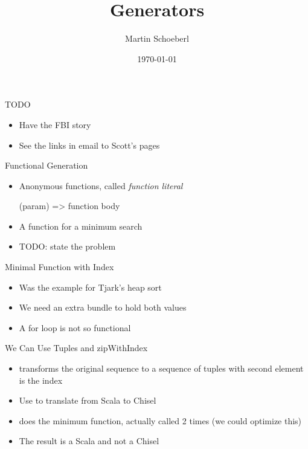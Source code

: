 

\newif\ifbook


\usepackage{tikz}
\usetikzlibrary{positioning, arrows.meta}


\title{Generators}
\author{Martin Schoeberl}
\date{\today}



\begin{frame}
\titlepage
\end{frame}

\begin{frame}[fragile]{TODO}
\begin{itemize}
\item Have the FBI story
\item See the links in email to Scott's pages
\end{itemize}
\end{frame}


\begin{frame}[fragile]{Functional Generation}
\begin{itemize}
\item Anonymous functions, called \emph{function literal}
\begin{chisel}
  (param) => function body
\end{chisel}
\item A function for a minimum search
\item TODO: state the problem
\end{itemize}
\end{frame}


\begin{frame}[fragile]{Minimal Function with Index}
\begin{itemize}
\item Was the example for Tjark's heap sort
\item We need an extra bundle to hold both values
\item A for loop is not so functional
\end{itemize}
\end{frame}

\begin{frame}[fragile]{We Can Use Tuples and zipWithIndex}
\begin{itemize}
\item {} transforms the original sequence to a sequence of tuples
with second element is the index
\item Use  to translate from Scala  to Chisel 
\item {} does the minimum function, actually called 2 times (we could optimize this)
\item The result is a Scala  and not a Chisel 
\end{itemize}
\end{frame}

